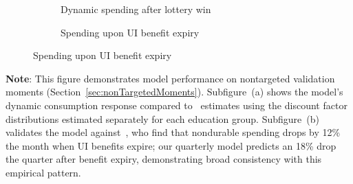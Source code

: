 \documentclass{econsocart}
\begin{document}
\begin{figure}[H]
  \centering
  \caption{\pregenmark Model validation for nontargeted spending patterns}
  \label{fig:untargetedMoments} %
  \noindent\begin{minipage}{\textwidth}
    \centering
    \begin{subfigure}[b]{.48\linewidth}
      \centering
      \caption{Dynamic spending after lottery win}
      \label{fig:USaggmpclotterywin} %
    \end{subfigure}
    \begin{subfigure}[b]{.48\linewidth}
      \centering
      \caption{Spending upon UI benefit expiry}
      \label{fig:expiryUI} %
    \end{subfigure}
  \end{minipage}
\end{figure}
\noindent\parbox{\textwidth}{\footnotesize
  \textbf{Note}: This figure demonstrates model performance on nontargeted validation moments (Section~\ref{sec:nonTargetedMoments}).
  Subfigure~(a) shows the model's dynamic consumption response compared to~\cite{fagereng-mpc-2021} estimates
  using the discount factor distributions estimated separately for each education group.
  Subfigure~(b) validates the model against~\cite{ganongConsumer2019}, who find that nondurable spending
  drops by 12\% the month when UI benefits expire; our quarterly model predicts an 18\% drop
  the quarter after benefit expiry,   demonstrating broad consistency with this empirical pattern.
}

\vspace{1em}  %
\end{document}
